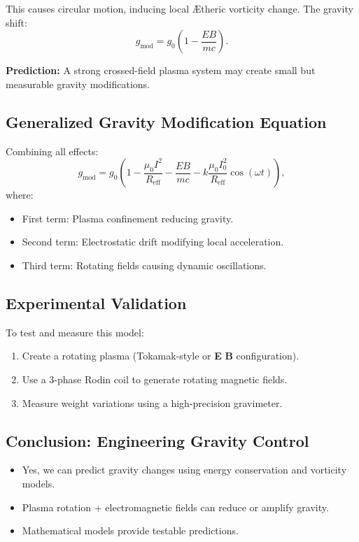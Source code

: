 \documentclass[a4paper,12pt]{article}
\begin{document}
This causes circular motion, inducing local Ætheric vorticity change. The gravity shift:
\begin{equation}
g_\text{mod} = g_0 \left(1 - \frac{E B}{m c} \right).
\end{equation}


\textbf{Prediction:} A strong crossed-field plasma system may create small but measurable gravity modifications.


\subsection{Generalized Gravity Modification Equation}
Combining all effects:
\begin{equation}
g_\text{mod} = g_0 \left(1 - \frac{\mu_0 I^2}{R_\text{eff}} - \frac{E B}{m c} - k \frac{\mu_0 I_0^2}{R_\text{eff}} \cos(\omega t) \right),
\end{equation}
where:
\begin{itemize}
\item First term: Plasma confinement reducing gravity.
\item Second term: Electrostatic drift modifying local acceleration.
\item Third term: Rotating fields causing dynamic oscillations.
\end{itemize}


\subsection{Experimental Validation}
To test and measure this model:
\begin{enumerate}
\item Create a rotating plasma (Tokamak-style or \textbf{E} \texttimes \textbf{B} configuration).
\item Use a 3-phase Rodin coil to generate rotating magnetic fields.
\item Measure weight variations using a high-precision gravimeter.
\end{enumerate}


\subsection{Conclusion: Engineering Gravity Control}
\begin{itemize}
\item Yes, we can predict gravity changes using energy conservation and vorticity models.
\item Plasma rotation + electromagnetic fields can reduce or amplify gravity.
\item Mathematical models provide testable predictions.
\end{itemize}
\end{document}
